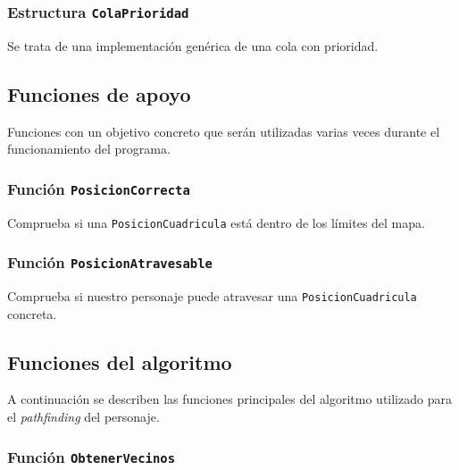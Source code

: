 \documentclass[11pt,a4paper]{article}
\begin{document}


\subsubsection*{Estructura \texttt{ColaPrioridad}}

Se trata de una implementación genérica de una cola con prioridad.


\subsection*{Funciones de apoyo}

Funciones con un objetivo concreto que serán utilizadas varias veces durante el funcionamiento del programa.

\subsubsection*{Función \texttt{PosicionCorrecta}}

Comprueba si una \texttt{PosicionCuadricula}  está dentro de los límites del mapa.



\subsubsection*{Función \texttt{PosicionAtravesable}}

Comprueba si nuestro personaje puede atravesar una \texttt{PosicionCuadricula}  concreta.



\subsection*{Funciones del algoritmo}%
\label{sec:funciones_del_algoritmo}

A continuación se describen las funciones principales del algoritmo utilizado para el \textit{pathfinding} del personaje.

\subsubsection*{Función \texttt{ObtenerVecinos} }%
\label{sub:funcion_obtenervecinos_}
\end{document}
